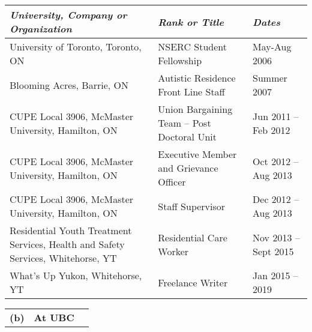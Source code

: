 \documentclass[11pt,notitlepage,english]{report}
\begin{document}
\begin{table}[H]
  \label{6. Employment Record}
  \begin{tabular}{|L{8cm}|L{5cm}|l|}
    \hline
    \textit{University, Company or Organization}                                     & \textit{Rank or Title}                     & \textit{Dates}       \\
    \hline
    University of Toronto, Toronto, ON                                               & NSERC Student Fellowship                   & May-Aug 2006         \\
    \hline
    Blooming Acres, Barrie, ON                                                       & Autistic Residence Front Line Staff        & Summer 2007          \\
    \hline
    CUPE Local 3906, McMaster University, Hamilton, ON                               & Union Bargaining Team – Post Doctoral Unit & Jun 2011 – Feb 2012  \\
    \hline
    CUPE Local 3906, McMaster University, Hamilton, ON                               & Executive Member and Grievance Officer     & Oct 2012 – Aug 2013  \\
    \hline
    CUPE Local 3906, McMaster University, Hamilton, ON                               & Staff Supervisor                           & Dec 2012 – Aug 2013  \\
    \hline
    Residential Youth Treatment Services, Health and Safety Services, Whitehorse, YT & Residential Care Worker                    & Nov 2013 – Sept 2015 \\
    \hline
    What’s Up Yukon, Whitehorse, YT                                                  & Freelance Writer                           & Jan 2015 – 2019      \\
    \hline
  \end{tabular}
\end{table}


\begin{tabular}{L{.5cm} L{8cm} L{6.9cm}}
  \textbf{(b)} & \textbf{At UBC} \\
\end{tabular}
\end{document}
